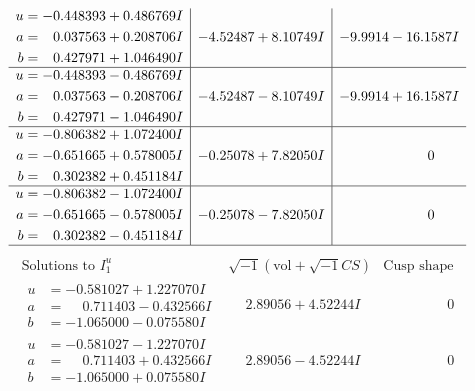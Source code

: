 \documentclass[1p]{elsarticle_modified}
\theoremstyle{definition}
\newcommand{\I}{\sqrt{-1}}
\begin{document}
$$\begin{array}{c|c|c}
\begin{aligned}
u &= -0.448393 + 0.486769 I \\
a &= \phantom{-}0.037563 + 0.208706 I \\
b &= \phantom{-}0.427971 + 1.046490 I\end{aligned}
 & -4.52487 + 8.10749 I & -9.9914 - 16.1587 I \\ \hline\begin{aligned}
u &= -0.448393 - 0.486769 I \\
a &= \phantom{-}0.037563 - 0.208706 I \\
b &= \phantom{-}0.427971 - 1.046490 I\end{aligned}
 & -4.52487 - 8.10749 I & -9.9914 + 16.1587 I \\ \hline\begin{aligned}
u &= -0.806382 + 1.072400 I \\
a &= -0.651665 + 0.578005 I \\
b &= \phantom{-}0.302382 + 0.451184 I\end{aligned}
 & -0.25078 + 7.82050 I & \phantom{-0.000000 } 0 \\ \hline\begin{aligned}
u &= -0.806382 - 1.072400 I \\
a &= -0.651665 - 0.578005 I \\
b &= \phantom{-}0.302382 - 0.451184 I\end{aligned}
 & -0.25078 - 7.82050 I & \phantom{-0.000000 } 0\\
 \hline 
 \end{array}$$\newpage$$\begin{array}{c|c|c}  
\text{Solutions to }I^u_{1}& \I (\text{vol} + \sqrt{-1}CS) & \text{Cusp shape}\\
 \hline 
\begin{aligned}
u &= -0.581027 + 1.227070 I \\
a &= \phantom{-}0.711403 - 0.432566 I \\
b &= -1.065000 - 0.075580 I\end{aligned}
 & \phantom{-}2.89056 + 4.52244 I & \phantom{-0.000000 } 0 \\ \hline\begin{aligned}
u &= -0.581027 - 1.227070 I \\
a &= \phantom{-}0.711403 + 0.432566 I \\
b &= -1.065000 + 0.075580 I\end{aligned}
 & \phantom{-}2.89056 - 4.52244 I & \phantom{-0.000000 } 0 \\ \hline\begin{aligned}

\end{aligned}
\end{array}$$
\end{document}
